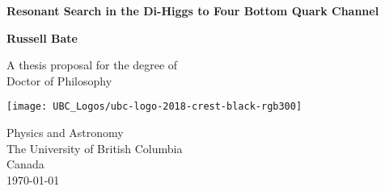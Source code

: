 \begin{titlepage}
    \begin{center}
        \vspace*{1cm}
            

        \Huge
        \textbf{Resonant Search in the Di-Higgs to Four Bottom Quark Channel}
            
        \vspace{1.5cm}
            
        \huge
        \textbf{Russell Bate}
            
        \vfill
            
        A thesis proposal for the degree of\\
        Doctor of Philosophy
            
        \vspace{0.8cm}
            
        \texttt{[image: UBC\_Logos/ubc-logo-2018-crest-black-rgb300]}
            
        \Large
        Physics and Astronomy\\
        The University of British Columbia\\
        Canada\\
        \today
            
    \end{center}
\end{titlepage}
